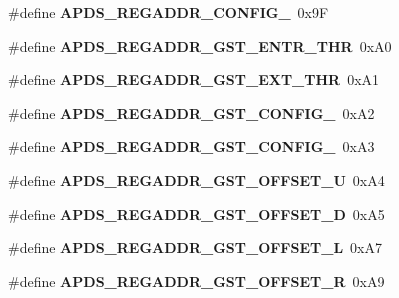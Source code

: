 \begin{DoxyCompactItemize}
\#define {\bfseries A\+P\+D\+S\+\_\+\+R\+E\+G\+A\+D\+D\+R\+\_\+\+C\+O\+N\+F\+I\+G\+\_}~0x9F
\item 
\mbox{\label{group__APDS9960__FunctionDefines_ga705934050395a71413a1f9cd00373243}} 
\#define {\bfseries A\+P\+D\+S\+\_\+\+R\+E\+G\+A\+D\+D\+R\+\_\+\+G\+S\+T\+\_\+\+E\+N\+T\+R\+\_\+\+T\+HR}~0x\+A0
\item 
\mbox{\label{group__APDS9960__FunctionDefines_gae65b74fda68672903cb711c5a52fb3b2}} 
\#define {\bfseries A\+P\+D\+S\+\_\+\+R\+E\+G\+A\+D\+D\+R\+\_\+\+G\+S\+T\+\_\+\+E\+X\+T\+\_\+\+T\+HR}~0x\+A1
\item 
\mbox{\label{group__APDS9960__FunctionDefines_gaae29a23f396c69a0ae8790ad5f24e9c3}} 
\#define {\bfseries A\+P\+D\+S\+\_\+\+R\+E\+G\+A\+D\+D\+R\+\_\+\+G\+S\+T\+\_\+\+C\+O\+N\+F\+I\+G\+\_}~0x\+A2
\item 
\mbox{\label{group__APDS9960__FunctionDefines_ga5f502f0e048545c4d8b107694f0ecd20}} 
\#define {\bfseries A\+P\+D\+S\+\_\+\+R\+E\+G\+A\+D\+D\+R\+\_\+\+G\+S\+T\+\_\+\+C\+O\+N\+F\+I\+G\+\_}~0x\+A3
\item 
\mbox{\label{group__APDS9960__FunctionDefines_ga48d1bda5fcf735a2f71db72509634c61}} 
\#define {\bfseries A\+P\+D\+S\+\_\+\+R\+E\+G\+A\+D\+D\+R\+\_\+\+G\+S\+T\+\_\+\+O\+F\+F\+S\+E\+T\+\_\+U}~0x\+A4
\item 
\mbox{\label{group__APDS9960__FunctionDefines_ga4a3a2b4270bb2d42b342d958436f73ce}} 
\#define {\bfseries A\+P\+D\+S\+\_\+\+R\+E\+G\+A\+D\+D\+R\+\_\+\+G\+S\+T\+\_\+\+O\+F\+F\+S\+E\+T\+\_\+D}~0x\+A5
\item 
\mbox{\label{group__APDS9960__FunctionDefines_ga19d5208c0f3bfb4ffd8ec2ee0c2ec2be}} 
\#define {\bfseries A\+P\+D\+S\+\_\+\+R\+E\+G\+A\+D\+D\+R\+\_\+\+G\+S\+T\+\_\+\+O\+F\+F\+S\+E\+T\+\_\+L}~0x\+A7
\item 
\mbox{\label{group__APDS9960__FunctionDefines_ga4944a50b10b6c84450409c668c46f98d}} 
\#define {\bfseries A\+P\+D\+S\+\_\+\+R\+E\+G\+A\+D\+D\+R\+\_\+\+G\+S\+T\+\_\+\+O\+F\+F\+S\+E\+T\+\_\+R}~0x\+A9

\end{DoxyCompactItemize}
